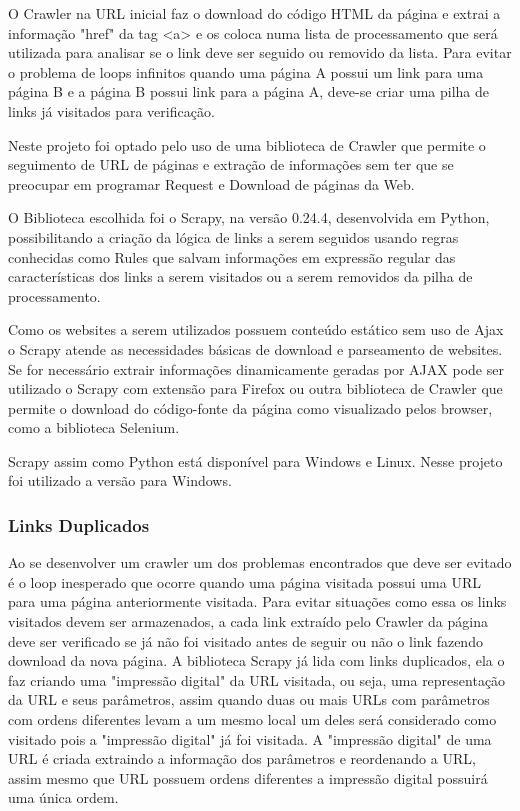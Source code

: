 \documentclass[12pt]{article}
\begin{document}
O Crawler na URL inicial faz o download do código HTML da página e extrai a informação "href" da tag <a> e os coloca numa lista de processamento que será utilizada para analisar se o link deve ser seguido ou removido da lista. 
Para evitar o problema de loops infinitos quando uma página A possui um link para uma página B e a página B possui link para a página A, deve-se criar uma pilha de links já visitados para verificação.   
 
Neste projeto foi optado pelo uso de uma biblioteca de Crawler que permite o seguimento de URL de páginas e extração de informações sem ter que se preocupar em programar Request e Download de páginas da Web.

O Biblioteca escolhida foi o Scrapy, na versão 0.24.4, desenvolvida em Python, possibilitando a criação da lógica de links a serem seguidos usando regras conhecidas como Rules que salvam informações em expressão regular das características dos links a serem visitados ou a serem removidos da pilha de processamento.
 
Como os websites a serem utilizados possuem conteúdo estático sem uso de Ajax o Scrapy atende as necessidades básicas de download e parseamento de websites. Se for necessário extrair informações dinamicamente geradas por AJAX pode ser utilizado o Scrapy com extensão para Firefox ou outra biblioteca de Crawler que permite o download do código-fonte da página como visualizado pelos browser, como a biblioteca Selenium.

Scrapy assim como Python está disponível para Windows e Linux. Nesse projeto foi utilizado a versão para Windows.

\subsubsection{Links Duplicados}

Ao se desenvolver um crawler um dos problemas encontrados que deve ser evitado é o loop inesperado que ocorre quando uma página visitada possui uma URL para uma página anteriormente visitada. Para evitar situações como essa os links visitados devem ser armazenados, a cada link extraído pelo Crawler da página deve ser verificado se já não foi visitado antes de seguir ou não o link fazendo download da nova página. 
A biblioteca Scrapy já lida com links duplicados, ela o faz criando uma "impressão digital" da URL visitada, ou seja, uma representação da URL e seus parâmetros, assim quando duas ou mais URLs com parâmetros com ordens diferentes levam a um mesmo local um deles será considerado como visitado pois a "impressão digital" já foi visitada. A "impressão digital" de uma URL é criada extraindo a informação dos parâmetros e reordenando a URL, assim mesmo que URL possuem ordens diferentes a impressão digital possuirá uma única ordem. 
\end{document}
